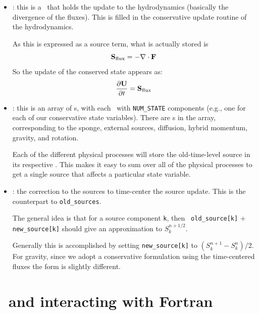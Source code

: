 \begin{itemize}

\item {} : this is a \multifab\ that holds the
  update to the hydrodynamics (basically the divergence of the
  fluxes).  This is filled in the conservative update routine of the
  hydrodynamics.

  As this is expressed as a source term, what is actually stored is
  \begin{equation}
    {\bf S}_\mathrm{flux} = -\nabla \cdot {\bf F}
  \end{equation}
  So the update of the conserved state appears as:
  \begin{equation}
    \frac{\partial {\bf U}}{\partial t} = {\bf S}_\mathrm{flux}
  \end{equation}

\item {} : this is an array of \multifab s, with
  each \multifab\ with {\tt NUM\_STATE} components (e.g., one for each
  of our conservative state variables).  There are 
  \multifab s in the array, corresponding to the sponge, external
  sources, diffusion, hybrid momentum, gravity, and rotation.

  Each of the different physical processes will store the
  old-time-level source in its respective \multifab.  This makes it
  easy to sum over all of the physical processes to get a single
  source that affects a particular state variable.

\item {} : the correction to the sources to
  time-center the source update.  This is the counterpart to
  {\tt old\_sources}.

  The general idea is that for a source component {\tt k}, then {\tt
    old\_source[k]} + {\tt new\_source[k]} should give an approximation
  to $S_k^{n+1/2}$.

  Generally this is accomplished by setting {\tt new\_source[k]} to
  $(S_k^{n+1} - S_k^{n})/2$.  For gravity, since we adopt a conservative
  formulation using the time-centered fluxes the form is slightly
  different.

\end{itemize}

\section{\mfiter\ and interacting with Fortran}

